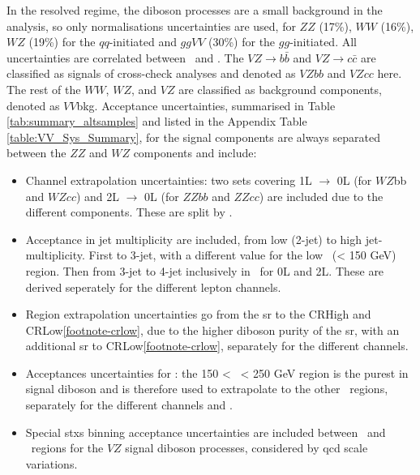 In the resolved regime, the diboson processes are a small background in the analysis, so only normalisations uncertainties are used, for $ZZ$ (17\%), $WW$ (16\%), $WZ$ (19\%) for the $qq$-initiated and $ggVV$ (30\%) for the $gg$-initiated. All uncertainties are correlated between \vhb\ and \vhc. The $VZ \rightarrow b\bar{b}$ and $VZ \rightarrow c\bar{c}$ are classified as signals of cross-check analyses and denoted as $VZbb$ and $VZcc$ here. The rest of the $WW$, $WZ$, and $VZ$ are classified as background components, denoted as $VV$bkg. Acceptance uncertainties, summarised in Table \ref{tab:summary_altsamples} and listed in the Appendix Table \ref{table:VV_Sys_Summary}, for the signal components are always separated between the $ZZ$ and $WZ$ components and include:
\begin{itemize}[leftmargin=*]
    \item Channel extrapolation uncertainties: two sets covering 1L $\rightarrow$ 0L (for $WZ$bb and $WZcc$) and 2L $\rightarrow$ 0L (for $ZZbb$ and $ZZcc$) are included due to the different components. These are split by \nj.
    \item Acceptance in jet multiplicity are included, from low (2-jet) to high jet-multiplicity. First to 3-jet, with a different value for the low \ptv\ (< 150 GeV) region. Then from 3-jet to 4-jet inclusively in \ptv\ for 0L and 2L. These are derived seperately for the different lepton channels.
    \item Region extrapolation uncertainties go from the \gls{sr} to the CRHigh and CRLow\cref{footnote-crlow}, due to the higher diboson purity of the \gls{sr}, with an additional \gls{sr} to CRLow\cref{footnote-crlow}, separately for the different channels.
    \item Acceptances uncertainties for \ptv: the 150 < \ptv\ < 250 GeV region is the purest in signal diboson  and is therefore used to extrapolate to the other \ptv\ regions, separately for the different channels and \nj.
    \item Special \gls{stxs} binning acceptance uncertainties are included between \nj\ and \ptv\ regions for the $VZ$ signal diboson processes, considered by \gls{qcd} scale variations. %
\end{itemize}

